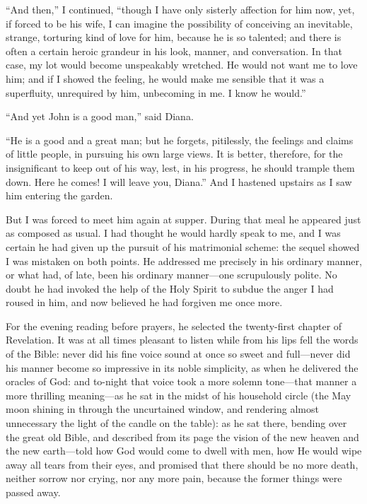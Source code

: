 \enquote{And then,} I continued, \enquote{though I have only sisterly
	affection for him now, yet, if forced to be his wife, I can imagine the
	possibility of conceiving an inevitable, strange, torturing kind of love
	for him, because he is so talented; and there is often a certain heroic
	grandeur in his look, manner, and conversation. In that case, my lot
	would become unspeakably wretched. He would not want me to love him;
	and if I showed the feeling, he would make me sensible that it was a
	superfluity, unrequired by him, unbecoming in me. I know he would.}

\enquote{And yet \St{} John is a good man,} said Diana.

\enquote{He is a good and a great man; but he forgets, pitilessly, the
	feelings and claims of little people, in pursuing his own large views.
	It is better, therefore, for the insignificant to keep out of his way,
	lest, in his progress, he should trample them down. Here he comes! I
	will leave you, Diana.} And I hastened upstairs as I saw him entering
the garden.

But I was forced to meet him again at supper. During that meal he
appeared just as composed as usual. I had thought he would hardly speak
to me, and I was certain he had given up the pursuit of his matrimonial
scheme: the sequel showed I was mistaken on both points. He addressed
me precisely in his ordinary manner, or what had, of late, been his
ordinary manner---one scrupulously polite. No doubt he had invoked the
help of the Holy Spirit to subdue the anger I had roused in him, and now
believed he had forgiven me once more.

For the evening reading before prayers, he selected the twenty-first
chapter of Revelation. It was at all times pleasant to listen while
from his lips fell the words of the Bible: never did his fine voice
sound at once so sweet and full---never did his manner become so
impressive in its noble simplicity, as when he delivered the oracles of
God: and to-night that voice took a more solemn tone---that manner a
more thrilling meaning---as he sat in the midst of his household circle
(the May moon shining in through the uncurtained window, and rendering
almost unnecessary the light of the candle on the table): as he sat
there, bending over the great old Bible, and described from its page the
vision of the new heaven and the new earth---told how God would come to
dwell with men, how He would wipe away all tears from their eyes, and
promised that there should be no more death, neither sorrow nor crying,
nor any more pain, because the former things were passed away.

